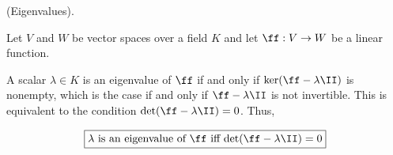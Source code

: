 \begin{deriv}
    (Eigenvalues).

    Let $V$ and $W$ be vector spaces over a field $K$ and let $\ff:V \rightarrow W$ be a linear function.
    
    A scalar $\lambda \in K$ is an eigenvalue of $\ff$ if and only if $\ker(\ff - \lambda \II)$ is nonempty, which is the case if and only if $\ff - \lambda \II$ is not invertible. This is equivalent to the condition $\det(\ff - \lambda \II) = 0$. Thus,

    \begin{align*}
        \boxed
        {
            \text{$\lambda$ is an eigenvalue of $\ff$ iff $\det(\ff - \lambda \II) = 0$}
        }
    \end{align*}
\end{deriv}
